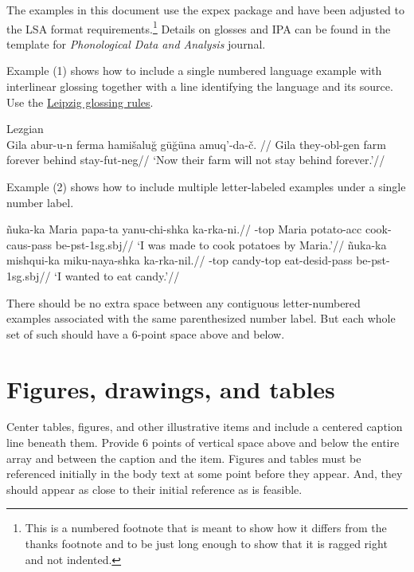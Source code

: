 \documentclass[12pt,letterpaper]{article}
\begin{document}
The examples in this document use the expex package and have been adjusted to the LSA format requirements.\footnote{This is a numbered footnote that is meant to show how it differs from the thanks footnote and to be just long enough to show that it is ragged right and not indented.} Details on glosses and IPA can be found in the template for \textit{Phonological Data and Analysis} journal.

Example (1) shows how to include a single numbered language example with interlinear glossing together with a line identifying the language and its source. Use the \href{http://www.eva.mpg.de/lingua/resources/glossing-rules.php}{Leipzig glossing rules}.

\pex[everygla={},aboveglftskip=0em,interpartskip=0em]
\begingl\label{Lezgian}Lezgian \citep[from][207]{haspelmath_1993}\\
\gla Gila abur-u-n ferma hami\v{s}alu\u{g} g\"{u}\u{g}\"{u}na amuq’-da-\v{c}. //
\glb Gila they-{\sc obl}-{\sc gen} farm forever behind stay-{\sc fut}-{\sc neg}//
\glft `Now their farm will not stay behind forever.'//
\endgl
\xe

Example (2) shows how to include multiple letter-labeled examples under a single number label.

\pex[everygla={},aboveglftskip=0em,interpartskip=0em]
\a \begingl
\gla \~nuka-ka Maria papa-ta yanu-chi-shka ka-rka-ni.//
-{\sc top} Maria potato-{\sc acc} cook-{\sc caus}-{\sc pass} be-{\sc pst}-{\sc 1sg.sbj}//
\glft `I was made to cook potatoes by Maria.'//
\endgl
\a \begingl
\gla *\~nuka-ka mishqui-ka miku-naya-shka ka-rka-nil.//
-{\sc top} candy-{\sc top} eat-{\sc desid}-{\sc pass} be-{\sc pst}-1{\sc sg.sbj}//
\glft `I wanted to eat candy.'//
\endgl
\xe

There should be no extra space between any contiguous letter-numbered examples associated with the same  parenthesized number label. But each whole set of such should have a 6-point space above and below.
 
\section{Figures, drawings, and tables}

Center tables, figures, and other illustrative items and include a centered caption line beneath them. Provide 6 points of vertical space above and below the entire array and between the caption and the item. Figures and tables must be referenced initially in the body text at some point before they appear. And, they should appear as close to their initial reference as is feasible.
\end{document}
